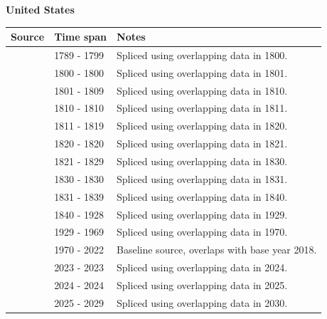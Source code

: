 \documentclass[12pt,a4paper,landscape]{article}
\begin{document}
\begin{adjustbox}{max totalsize={\paperwidth}{\paperheight},center}
\begin{minipage}[t][\textheight][t]{\textwidth}
\vspace*{0.5cm}
{}
\begin{center}
{\Large\bfseries United States}
\end{center}
\vspace{0.5cm}
\begin{table}[H]
\centering
\small
\begin{tabular}{|l|l|l|}
\hline
\textbf{Source} & \textbf{Time span} & \textbf{Notes} \\
\hline
\rowcolor{white}\cite{Mitchell}& 1789 - 1799 &Spliced using overlapping data in 1800.\\
\rowcolor{lightgray}\cite{CS2_USA}& 1800 - 1800 &Spliced using overlapping data in 1801.\\
\rowcolor{white}\cite{IMF_FPP}& 1801 - 1809 &Spliced using overlapping data in 1810.\\
\rowcolor{lightgray}\cite{CS2_USA}& 1810 - 1810 &Spliced using overlapping data in 1811.\\
\rowcolor{white}\cite{IMF_FPP}& 1811 - 1819 &Spliced using overlapping data in 1820.\\
\rowcolor{lightgray}\cite{CS2_USA}& 1820 - 1820 &Spliced using overlapping data in 1821.\\
\rowcolor{white}\cite{IMF_FPP}& 1821 - 1829 &Spliced using overlapping data in 1830.\\
\rowcolor{lightgray}\cite{CS2_USA}& 1830 - 1830 &Spliced using overlapping data in 1831.\\
\rowcolor{white}\cite{IMF_FPP}& 1831 - 1839 &Spliced using overlapping data in 1840.\\
\rowcolor{lightgray}\cite{CS2_USA}& 1840 - 1928 &Spliced using overlapping data in 1929.\\
\rowcolor{white}\cite{CS1_USA}& 1929 - 1969 &Spliced using overlapping data in 1970.\\
\rowcolor{lightgray}\cite{OECD_EO}& 1970 - 2022 &Baseline source, overlaps with base year 2018.\\
\rowcolor{white}\cite{WDI}& 2023 - 2023 &Spliced using overlapping data in 2024.\\
\rowcolor{lightgray}\cite{CS1_USA}& 2024 - 2024 &Spliced using overlapping data in 2025.\\
\rowcolor{white}\cite{IMF_WEO_forecast}& 2025 - 2029 &Spliced using overlapping data in 2030.\\

\end{tabular}
\end{table}
\end{minipage}
\end{adjustbox}
\end{document}
